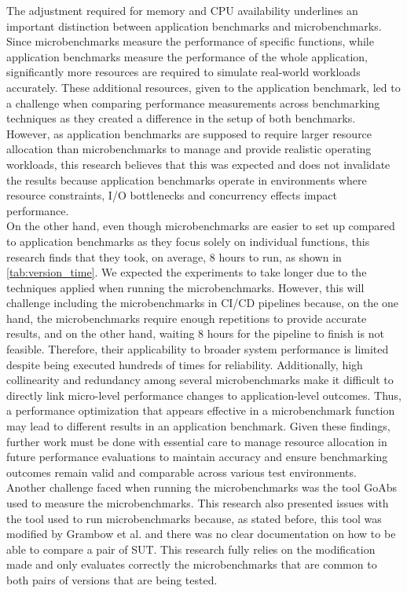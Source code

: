 The adjustment required for memory and \ac{CPU} availability underlines an important distinction between application benchmarks and microbenchmarks. Since microbenchmarks measure the performance of specific functions, while application benchmarks measure the performance of the whole application, significantly more resources are required to simulate real-world workloads accurately. These additional resources, given to the application benchmark, led to a challenge when comparing performance measurements across benchmarking techniques as they created a difference in the setup of both benchmarks. However, as application benchmarks are supposed to require larger resource allocation than microbenchmarks to manage and provide realistic operating workloads, this research believes that this was expected and does not invalidate the results because application benchmarks operate in environments where resource constraints, I/O bottlenecks and concurrency effects impact performance. \\ 
On the other hand, even though microbenchmarks are easier to set up compared to application benchmarks as they focus solely on individual functions, this research finds that they took, on average, 8 hours to run, as shown in \cref{tab:version_time}. We expected the experiments to take longer due to the techniques applied when running the microbenchmarks. However, this will challenge including the microbenchmarks in \ac{CI}/\ac{CD} pipelines because, on the one hand, the microbenchmarks require enough repetitions to provide accurate results, and on the other hand, waiting 8 hours for the pipeline to finish is not feasible. Therefore, their applicability to broader system performance is limited despite being executed hundreds of times for reliability. Additionally, high collinearity and redundancy among several microbenchmarks make it difficult to directly link micro-level performance changes to application-level outcomes. Thus, a performance optimization that appears effective in a microbenchmark function may lead to different results in an application benchmark. Given these findings, further work must be done with essential care to manage resource allocation in future performance evaluations to maintain accuracy and ensure benchmarking outcomes remain valid and comparable across various test environments. \\
Another challenge faced when running the microbenchmarks was the tool \ac{GoAbs} used to measure the microbenchmarks. This research also presented issues with the tool used to run microbenchmarks because, as stated before, this tool was modified by Grambow et al. \cite{grambow} and there was no clear documentation on how to be able to compare a pair of \ac{SUT}. This research fully relies on the modification made and only evaluates correctly the microbenchmarks that are common to both pairs of versions that are being tested.

